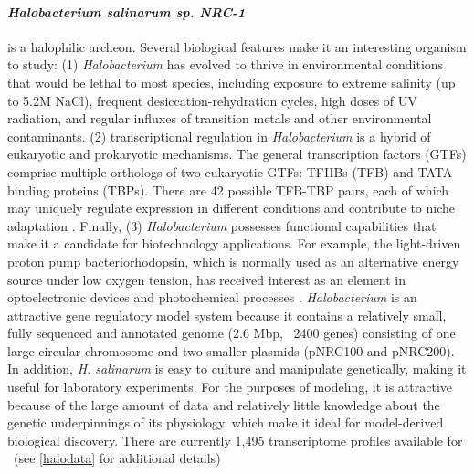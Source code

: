 \paragraph{\textit{Halobacterium salinarum sp. NRC-1}} is a halophilic archeon. Several biological features make it an interesting organism to study: (1) \textit{Halobacterium} has evolved to thrive in environmental conditions that would be lethal to most species, including exposure to extreme salinity (up to 5.2M NaCl), frequent desiccation-rehydration cycles, high doses of UV radiation, and regular influxes of transition metals and other environmental contaminants. (2) transcriptional regulation in \textit{Halobacterium} is a hybrid of eukaryotic and prokaryotic mechanisms. The general transcription factors (GTFs) comprise multiple orthologs of two eukaryotic GTFs: TFIIBs (TFB) and TATA binding proteins (TBPs). There are 42 possible TFB-TBP pairs, each of which may uniquely regulate expression in different conditions and contribute to niche adaptation \cite{facciotti_general_2007,turkarslan_niche_2011}. Finally, (3) \textit{Halobacterium} possesses functional capabilities that make it a candidate for biotechnology applications. For example, the light-driven proton pump bacteriorhodopsin, which is normally used as an alternative energy source under low oxygen tension, has received interest as an element in optoelectronic devices and photochemical processes \cite{oren_industrial_2010}.  \textit{Halobacterium} is an attractive gene regulatory model system because it contains a relatively small, fully sequenced and annotated genome (2.6 Mbp, ~2400 genes) consisting of one large circular chromosome and two smaller plasmids (pNRC100 and pNRC200). In addition, \textit{H. salinarum} is easy to culture and manipulate genetically, making it useful for laboratory experiments. For the purposes of modeling, it is attractive because of the large amount of data and relatively little knowledge about the genetic underpinnings of its physiology, which make it ideal for model-derived biological discovery. There are currently 1,495 transcriptome profiles available for \halo\ (see \ref{halodata} for additional details)

